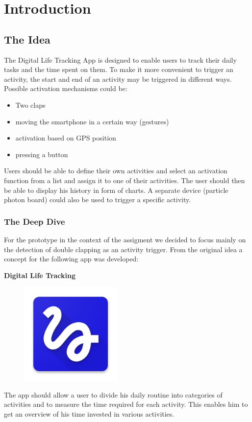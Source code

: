 \chapter{Introduction}
\label{sec:org7d7a9e6}
\section{The Idea}
\label{sec:org0041e00}

The Digital Life Tracking App is designed to enable users to track their daily tasks and the time spent on them.
To make it more convenient to trigger an activity, the start and end of an activity may be triggered in different ways. 
Possible activation mechanisms could be:
\begin{itemize}
\item Two claps
\item moving the smartphone in a certain way (gestures)
\item activation based on GPS position
\item pressing a button
\end{itemize}

Users should be able to define their own activities and select an activation function from a list and assign it to one of their activities.
The user should then be able to display his history in form of charts.
A separate device (particle photon board) could also be used to trigger a specific activity.

\subsection{The Deep Dive}
\label{sec:orgf0412a9}
For the prototype in the context of the assigment we decided to focus mainly on the detection of double clapping as an activity trigger. From the original idea a concept for the following app was developed:

\begin{center}
	\textbf{{\Large Digital Life Tracking}}
\end{center}
\begin{figure}[H]
	\centering
	\includegraphics[width=0.5\linewidth]{./imgs/appIcon.png}
\end{figure}
The app should allow a user to divide his daily routine into categories of activities and to measure the time required for each activity. This enables him to get an overview of his time invested in various activities.